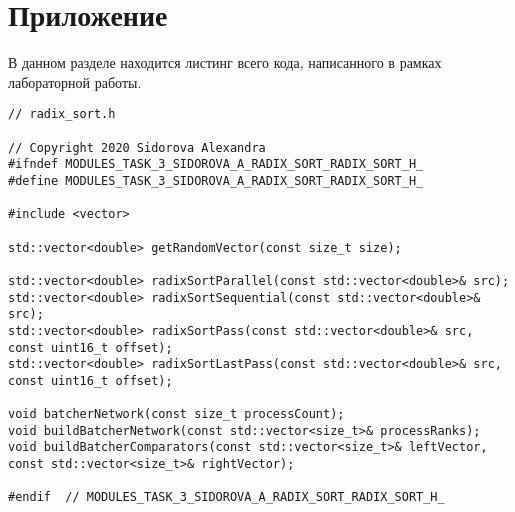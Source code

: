 \documentclass{report}
\begin{document}
\section*{Приложение}
В данном разделе находится листинг всего кода, написанного в рамках лабораторной работы.
\begin{lstlisting}
// radix_sort.h

// Copyright 2020 Sidorova Alexandra
#ifndef MODULES_TASK_3_SIDOROVA_A_RADIX_SORT_RADIX_SORT_H_
#define MODULES_TASK_3_SIDOROVA_A_RADIX_SORT_RADIX_SORT_H_

#include <vector>

std::vector<double> getRandomVector(const size_t size);

std::vector<double> radixSortParallel(const std::vector<double>& src);
std::vector<double> radixSortSequential(const std::vector<double>& src);
std::vector<double> radixSortPass(const std::vector<double>& src, const uint16_t offset);
std::vector<double> radixSortLastPass(const std::vector<double>& src, const uint16_t offset);

void batcherNetwork(const size_t processCount);
void buildBatcherNetwork(const std::vector<size_t>& processRanks);
void buildBatcherComparators(const std::vector<size_t>& leftVector, const std::vector<size_t>& rightVector);

#endif  // MODULES_TASK_3_SIDOROVA_A_RADIX_SORT_RADIX_SORT_H_
\end{lstlisting}
\end{document}
